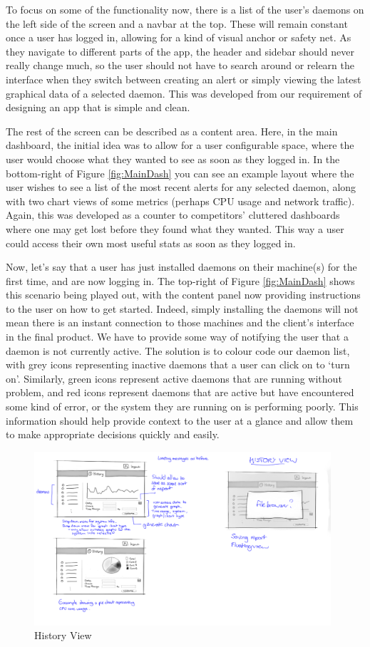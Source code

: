 \documentclass{l3proj}
\begin{document}
To focus on some of the functionality now, there is a list of the user's daemons on the left side of the screen and a navbar at the top. These will remain constant once a user has logged in, allowing for a kind of visual anchor or safety net. As they navigate to different parts of the app, the header and sidebar should never really change much, so the user should not have to search around or relearn the interface when they switch between creating an alert or simply viewing the latest graphical data of a selected daemon. This was developed from our requirement of designing an app that is simple and clean.

The rest of the screen can be described as a content area.  Here, in the main dashboard, the initial idea was to allow for a user configurable space, where the user would choose what they wanted to see as soon as they logged in. In the bottom-right of Figure \ref{fig:MainDash} you can see an example layout where the user wishes to see a list of the most recent alerts for any selected daemon, along with two chart views of some metrics (perhaps CPU usage and network traffic). Again, this was developed as a counter to competitors' cluttered dashboards where one may get lost before they found what they wanted. This way a user could access their own most useful stats as soon as they logged in.

Now, let's say that a user has just installed daemons on their machine(s) for the first time, and are now logging in. The top-right of Figure \ref{fig:MainDash} shows this scenario being played out, with the content panel now providing instructions to the user on how to get started. Indeed, simply installing the daemons will not mean there is an instant connection to those machines and the client's interface in the final product. We have to provide some way of notifying the user that a daemon is not currently active. The solution is to colour code our daemon list, with grey icons representing inactive daemons that a user can click on to `turn on'. Similarly, green icons represent active daemons that are running without problem, and red icons represent daemons that are active but have encountered some kind of error, or the system they are running on is performing poorly. This information should help provide context to the user at a glance and allow them to make appropriate decisions quickly and easily.

\begin{figure}[H]
\centering
\includegraphics[width=110mm]{Concept_Designs/HistoryView.png}
\caption{History View}
\label{fig:HistoryView}
\end{figure}
\end{document}
